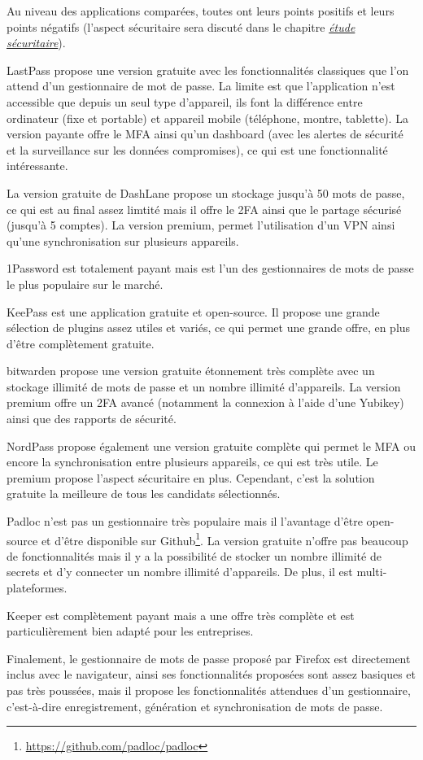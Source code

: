 Au niveau des applications comparées, toutes ont leurs points positifs et leurs points négatifs (l'aspect sécuritaire sera discuté dans le chapitre \hyperref[ch:etude_secu]{\textit{étude sécuritaire}}). 

LastPass propose une version gratuite avec les fonctionnalités classiques que l'on attend d'un gestionnaire de mot de passe. La limite est que l'application n'est accessible que depuis un seul type d'appareil, ils font la différence entre ordinateur (fixe et portable) et appareil mobile (téléphone, montre, tablette). La version payante offre le MFA ainsi qu'un dashboard (avec les alertes de sécurité et la surveillance sur les données compromises), ce qui est une fonctionnalité intéressante.

La version gratuite de DashLane propose un stockage jusqu'à 50 mots de passe, ce qui est au final assez limtité mais il offre le 2FA ainsi que le partage sécurisé (jusqu'à 5 comptes). La version premium, permet l'utilisation d'un VPN ainsi qu'une synchronisation sur plusieurs appareils.

1Password est totalement payant mais est l'un des gestionnaires de mots de passe le plus populaire sur le marché.

KeePass est une application gratuite et open-source. Il propose une grande sélection de plugins assez utiles et variés, ce qui permet une grande offre, en plus d'être complètement gratuite.

bitwarden propose une version gratuite étonnement très complète avec un stockage illimité de mots de passe et un nombre illimité d'appareils. La version premium offre un 2FA avancé (notamment la connexion à l'aide d'une Yubikey) ainsi que des rapports de sécurité.

NordPass propose également une version gratuite complète qui permet le MFA ou encore la synchronisation entre plusieurs appareils, ce qui est très utile. Le premium propose l'aspect sécuritaire en plus. Cependant, c'est la solution gratuite la meilleure de tous les candidats sélectionnés.

Padloc n'est pas un gestionnaire très populaire mais il l'avantage d'être open-source et d'être disponible sur Github\footnote{\href{https://github.com/padloc/padloc}{https://github.com/padloc/padloc}}. La version gratuite n'offre pas beaucoup de fonctionnalités mais il y a la possibilité de stocker un nombre illimité de secrets et d'y connecter un nombre illimité d'appareils. De plus, il est multi-plateformes.

Keeper est complètement payant mais a une offre très complète et est particulièrement bien adapté pour les entreprises.

Finalement, le gestionnaire de mots de passe proposé par Firefox est directement inclus avec le navigateur, ainsi ses fonctionnalités proposées sont assez basiques et pas très poussées, mais il propose les fonctionnalités attendues d'un gestionnaire, c'est-à-dire enregistrement, génération et synchronisation de mots de passe.
